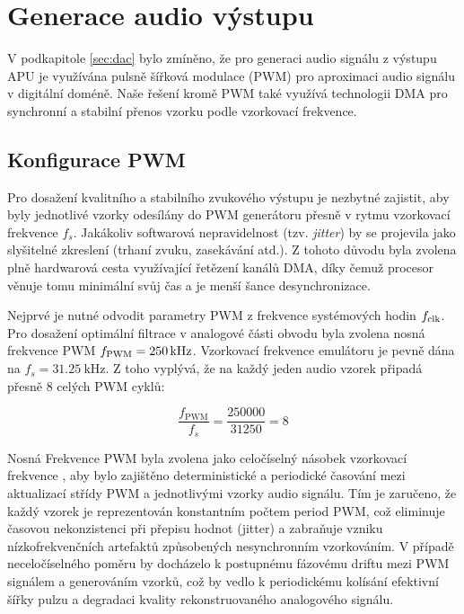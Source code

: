 \section{Generace audio výstupu}
\label{pp:audio}

V podkapitole \ref{sec:dac} bylo zmíněno, že pro generaci audio signálu z výstupu APU je využívána
pulsně šířková modulace (PWM) pro aproximaci audio signálu v digitální doméně. Naše řešení kromě PWM
také využívá technologii DMA pro synchronní a stabilní přenos vzorku podle vzorkovací frekvence.

\subsection{Konfigurace PWM}
\label{sub:pwm_configuration}

Pro dosažení kvalitního a stabilního zvukového výstupu je nezbytné zajistit, aby byly jednotlivé
vzorky odesílány do PWM generátoru přesně v rytmu vzorkovací frekvence $f_s$. Jakákoliv softwarová
nepravidelnost (tzv. \textit{jitter}) by se projevila jako slyšitelné zkreslení (trhaní zvuku,
zasekávání atd.). Z tohoto důvodu byla zvolena plně hardwarová cesta využívající řetězení kanálů
DMA, díky čemuž procesor věnuje tomu minimální svůj čas a je menší šance desynchronizace.

Nejprvé je nutné odvodit parametry PWM z frekvence systémových hodin $f_{{\text{clk}}}$. Pro
dosažení optimální filtrace v analogové části obvodu byla zvolena
nosná frekvence PWM $f_{{\text{PWM}}} = \SI{250}{\kilo\hertz}$. Vzorkovací frekvence emulátoru je
pevně dána na $f_s = \SI{31.25}{\kilo\hertz}$. Z toho vyplývá, že na každý jeden audio vzorek
připadá přesně 8 celých PWM cyklů:

$$
\frac{f_{\text{PWM}}}{f_s} = \frac{250000}{31250} = 8
$$

Nosná Frekvence PWM byla zvolena jako celočíselný násobek vzorkovací frekvence , aby bylo zajištěno
deterministické a periodické časování mezi aktualizací střídy PWM a jednotlivými vzorky audio
signálu. Tím je zaručeno, že každý vzorek je reprezentován konstantním počtem period PWM, což
eliminuje časovou nekonzistenci při přepisu hodnot (jitter) a zabraňuje vzniku nízkofrekvenčních
artefaktů způsobených nesynchronním vzorkováním. V případě neceločíselného poměru by docházelo k
postupnému fázovému driftu mezi PWM signálem a generováním vzorků, což by vedlo k periodickému
kolísání efektivní šířky pulzu a degradaci kvality rekonstruovaného analogového signálu.


